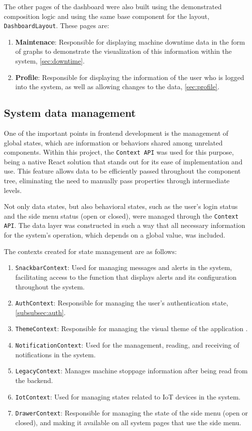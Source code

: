 The other pages of the dashboard were also built using the demonstrated composition logic and using the same base component for the layout, \texttt{DashboardLayout}. These pages are:
\begin{enumerate}
    \item \textbf{Maintenace}: Responsible for displaying machine downtime data in the form of graphs to demonstrate the visualization of this information within the system, \ref{sec:downtime}.
    \item \textbf{Profile}: Responsible for displaying the information of the user who is logged into the system, as well as allowing changes to the data, \ref{sec:profile}.
\end{enumerate}


\subsection{System data management}\label{subsec:contextApi}
One of the important points in frontend development is the management of global states, which are information or behaviors shared among unrelated components. Within this project, the \texttt{Context API} \cite{reactCreateContext} was used for this purpose, being a native React solution that stands out for its ease of implementation and use. This feature allows data to be efficiently passed throughout the component tree, eliminating the need to manually pass properties through intermediate levels.

Not only data states, but also behavioral states, such as the user's login status and the side menu status (open or closed), were managed through the \texttt{Context API}. The data layer was constructed in such a way that all necessary information for the system's operation, which depends on a global value, was included.

The contexts created for state management are as follows:
\begin{enumerate}
    \item \texttt{SnackbarContext}: Used for managing messages and alerts in the system, facilitating access to the function that displays alerts and its configuration throughout the system.
    \item \texttt{AuthContext}: Responsible for managing the user's authentication state, \ref{subsubsec:auth}.
    \item \texttt{ThemeContext}: Responsible for managing the visual theme of the application \cite{muiDefaultTheme}.
    \item \texttt{NotificationContext}: Used for the management, reading, and receiving of notifications in the system.
    \item \texttt{LegacyContext}: Manages machine stoppage information after being read from the backend.
    \item \texttt{IotContext}: Used for managing states related to IoT devices in the system.
    \item \texttt{DrawerContext}: Responsible for managing the state of the side menu (open or closed), and making it available on all system pages that use the side menu.
\end{enumerate}

